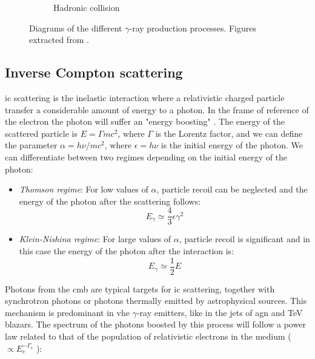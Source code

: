 \documentclass[main.tex]{subfiles}
\begin{document}
\begin{figure}
\begin{subfigure}{0.31\textwidth}
\caption{Hadronic collision} \label{fig:1i} 
\end{subfigure}
\caption{Diagrams of the different $\gamma$-ray production processes. Figures extracted from \cite{OyaVallejo:2010ipa} \label{fig:gammaproductionmec}.}
\end{figure}

\subsection{Inverse Compton scattering}\label{sec:IC}

\gls{ic} scattering is the inelastic interaction where a relativistic charged particle transfer a considerable amount of energy to a photon. In the frame of reference of the electron the photon will suffer an "energy boosting" \cite{weekes2003HEAstrophy}. The energy of the scattered particle is $E = \Gamma m c^2$, where $\Gamma$ is the Lorentz factor, and we can define the parameter $\alpha = h\nu/mc^2$, where $\epsilon = h\nu$ is the initial energy of the photon. We can differentiate between two regimes depending on the initial energy of the photon:

\begin{itemize}
    \item \textit{Thomson regime}: For low values of $\alpha$, particle recoil can be neglected and the energy of the photon after the scattering follows:\\
    \begin{equation}
         E_{\gamma}  \simeq \frac{4}{3}\epsilon \gamma^{2}
    \end{equation}
    
    \item \textit{Klein-Nishina regime}: For large values of $\alpha$, particle recoil is significant and in this case the energy of the photon after the interaction is:
    \begin{equation}
        E_{\gamma}  \simeq \frac{1}{2} E
    \end{equation}
\end{itemize}

Photons from the \gls{cmb} are typical targets for \gls{ic} scattering, together with synchrotron photons or photons thermally emitted by astrophysical sources. This mechanism is predominant in \gls{vhe} $\gamma$-ray emitters, like in the jets of \gls{agn} and TeV blazars. 
The spectrum of the photons boosted by this process will follow a power law related to that of the population of relativistic electrons in the medium ($\propto E_e^{-\Gamma_e}$ ):
\end{document}
